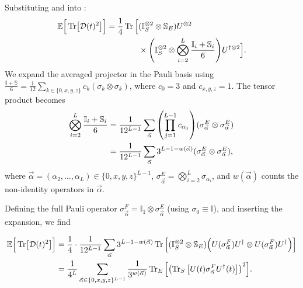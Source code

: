 Substituting  and
 into :
\begin{align}
\mathbb{E}\Big[\Tr[\mathcal{D}(t)^2]\Big]
= \frac{1}{4} \Tr \Big[ & (\mathbb{I}_S^{\otimes 2} \otimes \mathbb{S}_E)
U^{\otimes 2} \nonumber \\
& \times \qty( \mathbb{I}_S^{\otimes 2} \otimes
\bigotimes_{i=2}^L \frac{\mathbb{I}_i + \mathbb{S}_i}{6} )
U^{\dagger \otimes 2}
\Big].
\end{align}
We expand the averaged projector in the Pauli basis using
$\frac{\mathbb{I} + \mathbb{S}}{6} =
\frac{1}{12} \sum_{k \in \{0,x,y,z\}} c_k (\sigma_k \otimes \sigma_k)$,
where $c_0 = 3$ and $c_{x,y,z} = 1$. The tensor product becomes
\begin{align}
\bigotimes_{i=2}^L \frac{\mathbb{I}_i + \mathbb{S}_i}{6}
&= \frac{1}{12^{L-1}} \sum_{\vec{\alpha}}
\qty(\prod_{j=1}^{L-1} c_{\alpha_j})
(\sigma_{\vec{\alpha}}^E \otimes \sigma_{\vec{\alpha}}^E)
\nonumber \\
&= \frac{1}{12^{L-1}} \sum_{\vec{\alpha}}
3^{L-1-w(\vec{\alpha})}
(\sigma_{\vec{\alpha}}^E \otimes \sigma_{\vec{\alpha}}^E),
\end{align}
where $\vec{\alpha} = (\alpha_2, \dots, \alpha_L) \in \{0,x,y,z\}^{L-1}$,
$\sigma_{\vec{\alpha}}^E = \bigotimes_{i=2}^L \sigma_{\alpha_i}$,
and $w(\vec{\alpha})$ counts the non-identity operators in $\vec{\alpha}$.

Defining the full Pauli operator
$\sigma_{\vec{\alpha}}^F = \mathbb{I}_1 \otimes \sigma_{\vec{\alpha}}^E$
(using $\sigma_0 \equiv \mathbb{I}$), and inserting the
expansion, we find
\begin{widetext}
\begin{align}
\mathbb{E}\Big[\Tr[\mcD(t)^2]\Big]
&= \frac{1}{4} \cdot \frac{1}{12^{L-1}} \sum_{\vec{\alpha}} 3^{L-1-w(\vec{\alpha})}
\Tr \Big[ (\mathbb{I}_S^{\otimes 2} \otimes \mathbb{S}_E)
\Big( U (\sigma_{\vec{\alpha}}^F) U^\dagger
\otimes U (\sigma_{\vec{\alpha}}^F) U^\dagger \Big) \Big]
\nonumber \\
%
&= \frac{1}{4^{L}} \sum_{\vec{\alpha} \in \{0,x,y,z\}^{L-1}}
\frac{1}{3^{w(\vec{\alpha})}}
\Tr_E \Big[ \qty( \Tr_S \big[U(t)
\sigma_{\vec{\alpha}}^F U^\dagger(t) \big] )^2 \Big].
\label{eq:app:final_result}
\end{align}
\end{widetext}